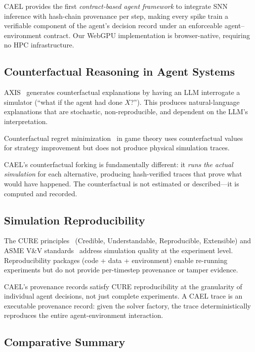 \documentclass[sigconf,nonacm]{acmart}
\begin{document}
CAEL provides the first \emph{contract-based agent framework} to integrate SNN
inference with hash-chain provenance per step, making every spike train a
verifiable component of the agent's decision record under an enforceable
agent--environment contract.
Our WebGPU implementation is browser-native,
requiring no HPC infrastructure.

\subsection{Counterfactual Reasoning in Agent Systems}

AXIS~\cite{axis2025} generates counterfactual explanations by having
an LLM interrogate a simulator (``what if the agent had done $X$?'').
This produces natural-language explanations that are stochastic,
non-reproducible, and dependent on the LLM's interpretation.

Counterfactual regret minimization~\cite{zinkevich2007cfr} in game
theory uses counterfactual values for strategy improvement but does
not produce physical simulation traces.

CAEL's counterfactual forking is fundamentally different: it
\emph{runs the actual simulation} for each alternative, producing
hash-verified traces that prove what would have happened. The
counterfactual is not estimated or described---it is computed and
recorded.

\subsection{Simulation Reproducibility}

The CURE principles~\cite{cure2024} (Credible, Understandable,
Reproducible, Extensible) and ASME V\&V standards~\cite{asme-vv10}
address simulation quality at the experiment level. Reproducibility
packages (code + data + environment) enable re-running experiments
but do not provide per-timestep provenance or tamper evidence.

CAEL's provenance records satisfy CURE reproducibility at the
granularity of individual agent decisions, not just complete
experiments. A CAEL trace is an executable provenance record:
given the solver factory, the trace deterministically reproduces
the entire agent-environment interaction.

\subsection{Comparative Summary}
\end{document}
